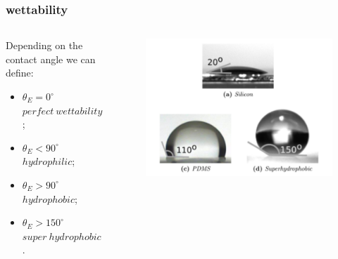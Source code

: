 \documentclass[xcolor=table]{beamer}
\begin{document}
\begin{frame}

\frametitle{wettability}
\fontsize{11}{13.2} \selectfont
\begin{columns}
\begin{column}{.4\textwidth}
 Depending on the contact angle we can define:
\begin{itemize}
	\item $\theta_E=0^\circ$ $perfect\ wettability$;
	\item $\theta_E<90^\circ$ $hydrophilic$;
	\item $\theta_E>90^\circ$ $hydrophobic$;
	\item $\theta_E>150^\circ$ $super\ hydrophobic$.
\end{itemize}
\end{column}
\begin{column}{.5\textwidth}
\begin{figure}
	\fontsize{3}{3} \selectfont
	\includegraphics[width=1.1\columnwidth]{Gocce_sessili.PNG} 
\end{figure}
\end{column}
\end{columns}
\end{frame}
\end{document}
